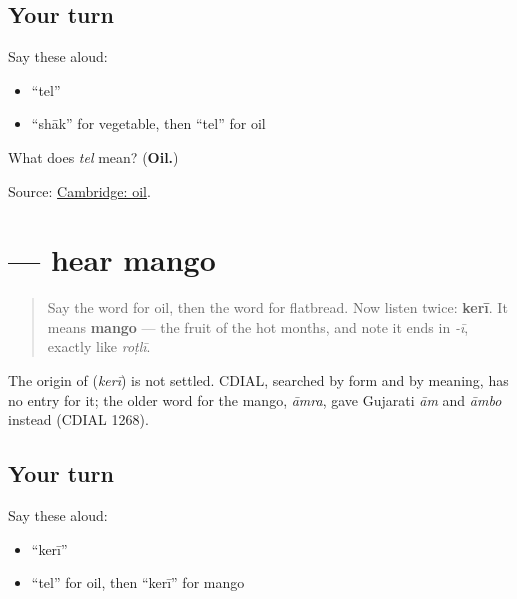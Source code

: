 \subsection*{Your turn}
Say these aloud:

\begin{itemize}
\raggedright
  \item \textquotedblleft{}tel\textquotedblright{}
  \item \textquotedblleft{}shāk\textquotedblright{} for vegetable, then \textquotedblleft{}tel\textquotedblright{} for oil
\end{itemize}

\begin{tcolorbox}[breakable,colback=teal!4,colframe=teal!35!black,title={Before you move on}]
What does \emph{tel} mean? (\textbf{Oil.})

Source: \href{https://dictionary.cambridge.org/dictionary/english-gujarati/oil}{Cambridge: oil}.
\end{tcolorbox}
\section[\texorpdfstring{\gu{કેરી} (kerī)}{કેરી (kerī)}]{ — hear mango}

\label{lesson:GU-C27-hear-keri}



\begin{quote}
Say the word for oil, then the word for flatbread. Now listen twice: \textbf{kerī}. It means \textbf{mango} — the fruit of the hot months, and note it ends in \emph{-ī}, exactly like \emph{roṭlī}.
\end{quote}

\begin{cousinweb}
The origin of \textbf{} (\emph{kerī}) is not settled. CDIAL, searched by form and by meaning, has no entry for it; the older word for the mango, \emph{āmra}, gave Gujarati \emph{ām} and \emph{āmbo} instead (CDIAL 1268).
\end{cousinweb}

\subsection*{Your turn}
Say these aloud:

\begin{itemize}
\raggedright
  \item \textquotedblleft{}kerī\textquotedblright{}
  \item \textquotedblleft{}tel\textquotedblright{} for oil, then \textquotedblleft{}kerī\textquotedblright{} for mango
\end{itemize}

